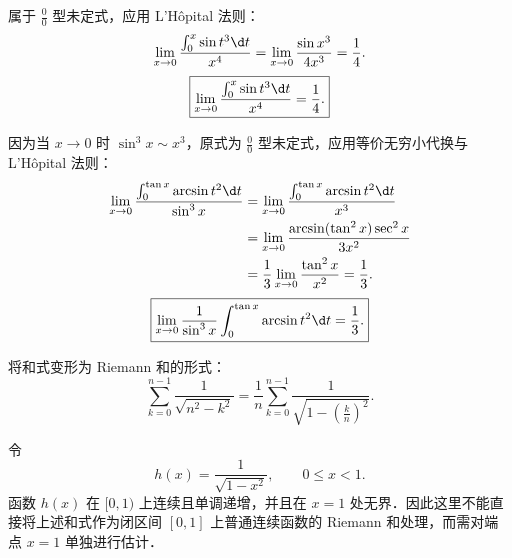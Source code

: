 \begin{solution}

    属于 $\frac{0}{0}$ 型未定式，应用 L'H\^{o}pital 法则：
    \begin{equation}
        \lim_{x\to 0} \frac{\int_0^x \sin t^3 \d t}{x^4} = \lim_{x\to 0} \frac{\sin x^3}{4x^3} = \frac{1}{4}.
    \end{equation}
    \begin{equation}
        \boxed{\lim_{x\to 0} \frac{\int_0^x \sin t^3 \d t}{x^4} = \frac{1}{4}.}
    \end{equation}


    因为当 $x \to 0$ 时 $\sin^3 x \sim x^3$，原式为 $\frac{0}{0}$ 型未定式，应用等价无穷小代换与 L'H\^{o}pital 法则：
    \begin{equation}
        \begin{aligned}
            \lim_{x\to 0} \frac{\int_0^{\tan x} \arcsin t^2 \d t}{\sin^3 x} & = \lim_{x\to 0} \frac{\int_0^{\tan x} \arcsin t^2 \d t}{x^3}    \\
                                                                            & = \lim_{x\to 0} \frac{\arcsin(\tan^2 x) \sec^2 x}{3x^2}         \\
                                                                            & = \frac{1}{3} \lim_{x\to 0} \frac{\tan^2 x}{x^2} = \frac{1}{3}.
        \end{aligned}
    \end{equation}
    \begin{equation}
        \boxed{\lim_{x\to 0} \frac{1}{\sin^3 x} \int_0^{\tan x} \arcsin t^2 \d t = \frac{1}{3}.}
    \end{equation}


    将和式变形为 Riemann 和的形式：
    \begin{equation}
        \sum_{k=0}^{n-1} \frac{1}{\sqrt{n^2 - k^2}}
        = \frac{1}{n}\sum_{k=0}^{n-1}
        \frac{1}{\sqrt{1 - \left(\frac{k}{n}\right)^2}}.
    \end{equation}

    令
    \begin{equation}
        h(x) = \frac{1}{\sqrt{1 - x^2}}, \qquad 0 \leqslant x < 1.
    \end{equation}
    函数 $h(x)$ 在 $[0, 1)$ 上连续且单调递增，并且在 $x = 1$ 处无界．因此这里不能直接将上述和式作为闭区间 $[0, 1]$ 上普通连续函数的 Riemann 和处理，而需对端点 $x = 1$ 单独进行估计．


\end{solution}
